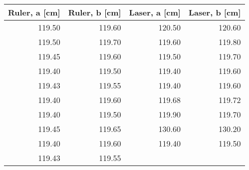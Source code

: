 \begin{tabular}{rrrr}
\hline
   Ruler, a [cm] &   Ruler, b [cm] &   Laser, a [cm] &   Laser, b [cm] \\
\hline
          119.50 &          119.60 &          120.50 &          120.60 \\
          119.50 &          119.70 &          119.60 &          119.80 \\
          119.45 &          119.60 &          119.50 &          119.70 \\
          119.40 &          119.50 &          119.40 &          119.60 \\
          119.43 &          119.55 &          119.40 &          119.60 \\
          119.40 &          119.60 &          119.68 &          119.72 \\
          119.40 &          119.50 &          119.90 &          119.70 \\
          119.45 &          119.65 &          130.60 &          130.20 \\
          119.40 &          119.60 &          119.40 &          119.50 \\
          119.43 &          119.55 &            	 &            	   \\
\hline
\end{tabular}
